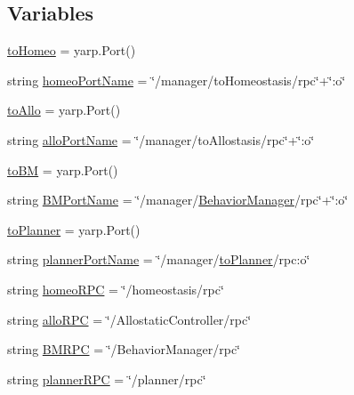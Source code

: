 \subsection*{Variables}
\begin{DoxyCompactItemize}
\item 
\hyperlink{namespacedrive__control__rpc_ae6ad8a5770f962e3e8aea3973fd88b00}{to\+Homeo} = yarp.\+Port()
\item 
string \hyperlink{namespacedrive__control__rpc_a5b80d44e37ed97451180de56fd8b821c}{homeo\+Port\+Name} = \char`\"{}/manager/to\+Homeostasis/rpc\char`\"{}+\char`\"{}\+:o\char`\"{}
\item 
\hyperlink{namespacedrive__control__rpc_a0e43be475c3d74c9ca8920fae92596de}{to\+Allo} = yarp.\+Port()
\item 
string \hyperlink{namespacedrive__control__rpc_ab62ff19a86d33c22ab186c85f5699cb6}{allo\+Port\+Name} = \char`\"{}/manager/to\+Allostasis/rpc\char`\"{}+\char`\"{}\+:o\char`\"{}
\item 
\hyperlink{namespacedrive__control__rpc_aa4a8cdca551c7850b14c6973b6229e1e}{to\+BM} = yarp.\+Port()
\item 
string \hyperlink{namespacedrive__control__rpc_a366fa62e9ed70cee700accf21969cd1e}{B\+M\+Port\+Name} = \char`\"{}/manager/\hyperlink{group__behaviorManager_classBehaviorManager}{Behavior\+Manager}/rpc\char`\"{}+\char`\"{}\+:o\char`\"{}
\item 
\hyperlink{namespacedrive__control__rpc_a4b139dc4cf2516862cb2860fc6fdc7b7}{to\+Planner} = yarp.\+Port()
\item 
string \hyperlink{namespacedrive__control__rpc_a9b49d423ea4927c8e3d8b555172e4266}{planner\+Port\+Name} = \char`\"{}/manager/\hyperlink{namespacedrive__control__rpc_a4b139dc4cf2516862cb2860fc6fdc7b7}{to\+Planner}/rpc\+:o\char`\"{}
\item 
string \hyperlink{namespacedrive__control__rpc_adf4dbbd6ca19ea81bb4d904b4a139d69}{homeo\+R\+PC} = \char`\"{}/homeostasis/rpc\char`\"{}
\item 
string \hyperlink{namespacedrive__control__rpc_a2cda3eb73a3944cdfd048d403ce65c74}{allo\+R\+PC} = \char`\"{}/Allostatic\+Controller/rpc\char`\"{}
\item 
string \hyperlink{namespacedrive__control__rpc_a420b5de110ae5e208dc1ce957f90711e}{B\+M\+R\+PC} = \char`\"{}/Behavior\+Manager/rpc\char`\"{}
\item 
string \hyperlink{namespacedrive__control__rpc_a5040c9c692daba5e981ee0ff844f9202}{planner\+R\+PC} = \char`\"{}/planner/rpc\char`\"{}
\end{DoxyCompactItemize}


